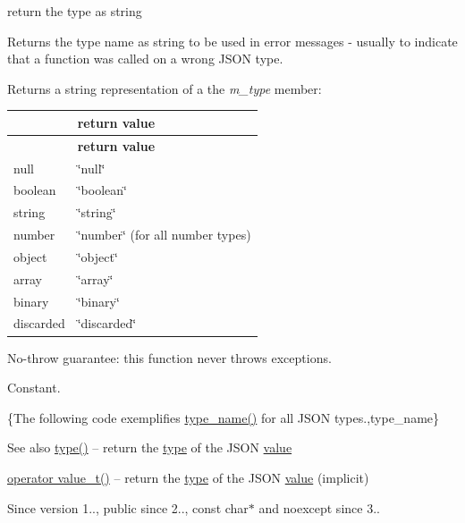 return the type as string 

Returns the type name as string to be used in error messages -\/ usually to indicate that a function was called on a wrong J\+S\+ON type.

\begin{DoxyReturn}{Returns}
a string representation of a the {\itshape m\+\_\+type} member\+: \tabulinesep=1mm
\begin{longtabu} spread 0pt [c]{*2{|X[-1]}|}
\hline
{}&{\bf return value  }\\
\endfirsthead
\hline
\endfoot
\hline
{}&{\bf return value  }\\
\endhead
null &{\ttfamily \char`\"{}null\char`\"{}} \\
boolean &{\ttfamily \char`\"{}boolean\char`\"{}} \\
string &{\ttfamily \char`\"{}string\char`\"{}} \\
number &{\ttfamily \char`\"{}number\char`\"{}} (for all number types) \\
object &{\ttfamily \char`\"{}object\char`\"{}} \\
array &{\ttfamily \char`\"{}array\char`\"{}} \\
binary &{\ttfamily \char`\"{}binary\char`\"{}} \\
discarded &{\ttfamily \char`\"{}discarded\char`\"{}} \\
\end{longtabu}
No-\/throw guarantee\+: this function never throws exceptions.
\end{DoxyReturn}
Constant.

\{The following code exemplifies {\ttfamily \hyperlink{classnlohmann_1_1basic__json_a459dbfcd47bd632ca82ca8ff8db278c8}{type\+\_\+name()}} for all J\+S\+ON types.,type\+\_\+name\}

\begin{DoxySeeAlso}{See also}
\hyperlink{classnlohmann_1_1basic__json_a5b7c4b35a0ad9f97474912a08965d7ad}{type()} -- return the \hyperlink{classnlohmann_1_1basic__json_a5b7c4b35a0ad9f97474912a08965d7ad}{type} of the J\+S\+ON \hyperlink{classnlohmann_1_1basic__json_ac9e014095170d72c4c57e3daf8efc059}{value} 

\hyperlink{classnlohmann_1_1basic__json_a6d4b8df10ecc533a50823e8805f4a873}{operator value\+\_\+t()} -- return the \hyperlink{classnlohmann_1_1basic__json_a5b7c4b35a0ad9f97474912a08965d7ad}{type} of the J\+S\+ON \hyperlink{classnlohmann_1_1basic__json_ac9e014095170d72c4c57e3daf8efc059}{value} (implicit)
\end{DoxySeeAlso}
\begin{DoxySince}{Since}
version 1.., public since 2.., {\ttfamily const char$\ast$} and {\ttfamily noexcept} since 3.. 
\end{DoxySince}
